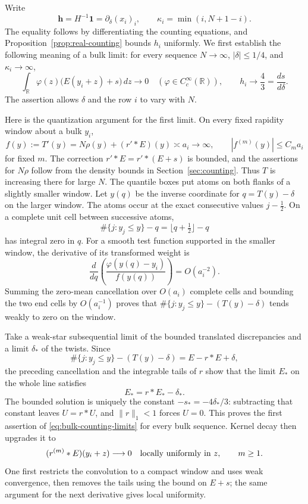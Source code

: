 Write
\[
 \boldsymbol h=H^{-1}\boldsymbol1=\partial_\delta(x_i)_i,
 \qquad \kappa_i=\min(i,N+1-i).
\]
The equality follows by differentiating the counting equations, and
Proposition~\ref{prop:real-counting} bounds \(h_i\) uniformly. We first establish the following meaning of a bulk limit: for every sequence
\(N\to\infty\), \(|\delta|\le1/4\), and \(\kappa_i\to\infty\),
\begin{equation}\label{eq:bulk-counting-limits}
 \int_{\mathbb R}\varphi(z)\bigl(E(y_i+z)+s\bigr)\,dz\longrightarrow0
 \quad(\varphi\in C_c^\infty(\mathbb R)),\qquad
 h_i\longrightarrow\frac43=\frac{ds}{d\delta}.
\end{equation}
The assertion allows \(\delta\) and the row \(i\) to vary with \(N\).

Here is the quantization argument for the first limit. On every fixed rapidity window about a bulk \(y_i\),
\[
 f(y):=T'(y)=N\rho(y)+(r'*E)(y)\asymp a_i\longrightarrow\infty,
 \qquad |f^{(m)}(y)|\le C_m a_i
\]
for fixed \(m\). The correction \(r'*E=r'*(E+s)\) is bounded, and the assertions for \(N\rho\) follow from the density bounds in Section~\ref{sec:counting}. Thus \(T\) is increasing there for large \(N\). The quantile boxes put atoms on both flanks of a slightly smaller window. Let \(y(q)\) be the inverse coordinate for \(q=T(y)-\delta\) on the larger window. The atoms occur at the exact consecutive values \(j-\tfrac12\). On a complete unit cell between successive atoms,
\[
 \#\{j:y_j\le y\}-q=\lfloor q+\tfrac12\rfloor-q
\]
has integral zero in \(q\). For a smooth test function supported in the smaller window, the derivative of its transformed weight is
\[
 \frac{d}{dq}\left(\frac{\varphi(y(q)-y_i)}{f(y(q))}\right)
 =O(a_i^{-2}).
\]
Summing the zero-mean cancellation over \(O(a_i)\) complete cells and bounding the two end cells by \(O(a_i^{-1})\) proves that
\(\#\{j:y_j\le y\}-(T(y)-\delta)\) tends weakly to zero on the window.

Take a weak-star subsequential limit of the bounded translated discrepancies and a limit \(\delta_*\) of the twists. Since
\[
 \#\{j:y_j\le y\}-(T(y)-\delta)=E-r*E+\delta,
\]
the preceding cancellation and the integrable tails of \(r\) show that the limit \(E_*\) on the whole line satisfies
\[
 E_*=r*E_*-\delta_*.
\]
The bounded solution is uniquely the constant \(-s_*=-4\delta_*/3\): subtracting that constant leaves \(U=r*U\), and
\(\|r\|_1<1\) forces \(U=0\). This proves the first assertion of
\eqref{eq:bulk-counting-limits} for every bulk sequence. Kernel decay then upgrades it to
\begin{equation}\label{eq:bulk-smooth-correction}
 (r^{(m)}*E)(y_i+z)\longrightarrow0
 \quad\hbox{locally uniformly in }z,\qquad m\ge1.
\end{equation}
One first restricts the convolution to a compact window and uses weak convergence, then removes the tails using the bound on \(E+s\); the same argument for the next derivative gives local uniformity.


